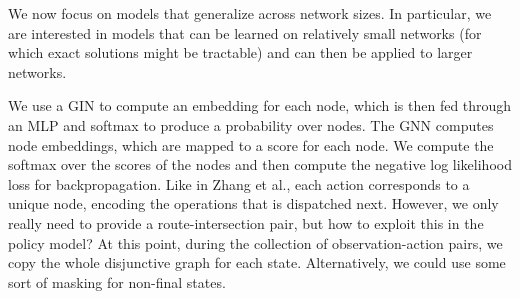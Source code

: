 \documentclass[a4paper]{article}
\theoremstyle{definition}
\theoremstyle{plain}
\begin{document}
We now focus on models that generalize across network sizes. In particular, we
are interested in models that can be learned on relatively small networks (for
which exact solutions might be tractable) and can then be applied to larger
networks.

We use a GIN to compute an embedding for each node, which is then fed through an
MLP and softmax to produce a probability over nodes. The GNN computes node
embeddings, which are mapped to a score for each node. We compute the softmax
over the scores of the nodes and then compute the negative log likelihood loss
for backpropagation.
%
Like in Zhang et al., each action corresponds to a unique node, encoding the
operations that is dispatched next. However, we only really need to provide a
route-intersection pair, but how to exploit this in the policy model?
%
At this point, during the collection of observation-action pairs, we copy the
whole disjunctive graph for each state. Alternatively, we could use some sort of
masking for non-final states.





\end{document}
